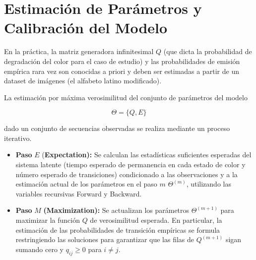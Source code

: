 \documentclass[
  spanish,
  us-letterpaper,
  DIV=11,
  numbers=noendperiod]{scrreprt}
\newcounter{quartocalloutnteno}
\newcommand{\quartocalloutnte}[1]{\refstepcounter{quartocalloutnteno}\label{#1}}
\begin{document}
\section{Estimación de Parámetros y Calibración del
Modelo}\label{estimaciuxf3n-de-paruxe1metros-y-calibraciuxf3n-del-modelo}

En la práctica, la matriz generadora infinitesimal \(Q\) (que dicta la
probabilidad de degradación del color para el caso de estudio) y las
probabilidades de emisión empírica rara vez son conocidas a priori y
deben ser estimadas a partir de un dataset de imágenes (el alfabeto
latino modificado).

\begin{tcolorbox}[enhanced jigsaw, bottomtitle=1mm, opacityback=0, colback=white, colframe=quarto-callout-important-color-frame, leftrule=.75mm, rightrule=.15mm, breakable, colbacktitle=quarto-callout-important-color!10!white, toprule=.15mm, toptitle=1mm, arc=.35mm, title=\textcolor{quarto-callout-important-color}{\faExclamation}\hspace{0.5em}{Importante \ref*{nte-baum-welch}: Propiedad (Algoritmo de Expectation-Maximization (Baum-Welch))}, opacitybacktitle=0.6, titlerule=0mm, bottomrule=.15mm, coltitle=black, left=2mm]

\quartocalloutnte{nte-baum-welch} 

La estimación por máxima verosimilitud del conjunto de parámetros del
modelo

\[
\Theta=\{Q,E\}
\]

dado un conjunto de secuencias observadas se realiza mediante un proceso
iterativo.

\begin{itemize}
\item
  \textbf{Paso} \(E\) (\textbf{Expectation):} Se calculan las
  estadísticas suficientes esperadas del sistema latente (tiempo
  esperado de permanencia en cada estado de color y número esperado de
  transiciones) condicionado a las observaciones y a la estimación
  actual de los parámetros en el paso \(m\) \(\Theta^{(m)}\), utilizando
  las variables recursivas Forward y Backward.
\item
  \textbf{Paso} \(M\) \textbf{(Maximization):} Se actualizan los
  parámetros \(\Theta^{(m+1)}\) para maximizar la función \(Q\) de
  verosimilitud esperada. En particular, la estimación de las
  probabilidades de transición empíricas se formula restringiendo las
  soluciones para garantizar que las filas de \(Q^{(m+1)}\) sigan
  sumando cero y \(q_{ij}\ge0\) para \(i\neq j\).
\end{itemize}

\end{tcolorbox}
\end{document}
